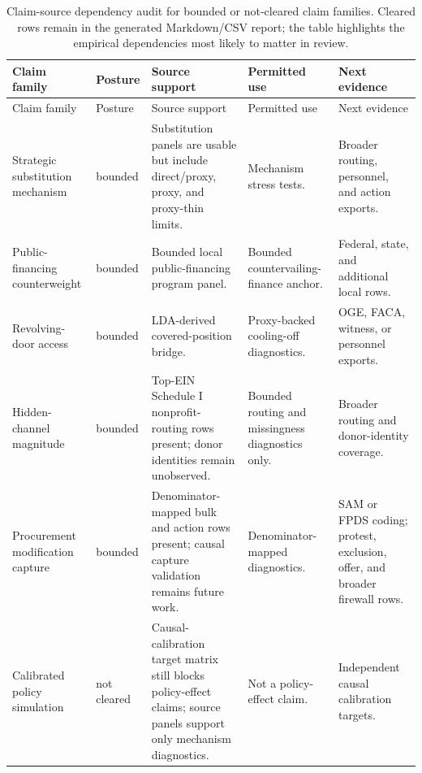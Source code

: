 \begingroup
\scriptsize
\setlength{\tabcolsep}{3pt}
\begin{longtable}{p{}p{}p{}p{}p{}}
\caption{Claim-source dependency audit for bounded or not-cleared claim families. Cleared rows remain in the generated Markdown/CSV report; the table highlights the empirical dependencies most likely to matter in review.}\label{tab:claim-source-dependency}\\
\toprule
Claim family & Posture & Source support & Permitted use & Next evidence \\
\midrule
\endfirsthead
\toprule
Claim family & Posture & Source support & Permitted use & Next evidence \\
\midrule
\endhead
Strategic substitution mechanism & bounded & Substitution panels are usable but include direct/proxy, proxy, and proxy-thin limits. & Mechanism stress tests. & Broader routing, personnel, and action exports. \\
Public-financing counterweight & bounded & Bounded local public-financing program panel. & Bounded countervailing-finance anchor. & Federal, state, and additional local rows. \\
Revolving-door access & bounded & LDA-derived covered-position bridge. & Proxy-backed cooling-off diagnostics. & OGE, FACA, witness, or personnel exports. \\
Hidden-channel magnitude & bounded & Top-EIN Schedule I nonprofit-routing rows present; donor identities remain unobserved. & Bounded routing and missingness diagnostics only. & Broader routing and donor-identity coverage. \\
Procurement modification capture & bounded & Denominator-mapped bulk and action rows present; causal capture validation remains future work. & Denominator-mapped diagnostics. & SAM or FPDS coding; protest, exclusion, offer, and broader firewall rows. \\
Calibrated policy simulation & not cleared & Causal-calibration target matrix still blocks policy-effect claims; source panels support only mechanism diagnostics. & Not a policy-effect claim. & Independent causal calibration targets. \\
\bottomrule
\end{longtable}
\endgroup
